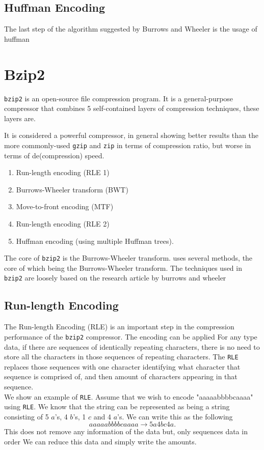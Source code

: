 \documentclass{article}
\begin{document}
\subsection{Huffman Encoding}
The last step of the algorithm suggested by Burrows and Wheeler is the usage of huffman

\section{Bzip2}
\texttt{bzip2} is an open-source file compression program. It is a general-purpose compressor that combines 5 self-contained layers of compression techniques, these layers are. 

It is considered a powerful compressor, in general showing better results than the more commonly-used \texttt{gzip} and \texttt{zip} in terms of compression ratio, but worse in terms of de(compression) speed.

\begin{enumerate}
	\item Run-length encoding (RLE 1)
	\item Burrows-Wheeler transform (BWT)
	\item Move-to-front encoding (MTF)
	\item Run-length encoding (RLE 2)
	\item Huffman encoding (using multiple Huffman trees).
\end{enumerate}

The core of \texttt{bzip2} is the Burrows-Wheeler transform. uses several methods, the core of which being the Burrows-Wheeler transform. The techniques used in \texttt{bzip2} are loosely based on the research article by burrows and wheeler %

\subsection{Run-length Encoding}
The Run-length Encoding (RLE) is an important step in the compression performance of the \texttt{bzip2} compressor.
The encoding can be applied
For any type data, if there are sequences of identically repeating characters, there is no need to store all the characters in those sequences of repeating characters. The \texttt{RLE} replaces those sequences with one character identifying what character that sequence is comprised of, and then amount of characters appearing in that sequence.\\
We show an example of \texttt{RLE}. Assume that we wish to encode "aaaaabbbbcaaaa" using \texttt{RLE}. We know that the string can be represented as being a string consisting of 5 \(a\)'s, 4 \(b\)'s, 1 \(c\) and 4 \(a\)'s. We can write this as the following
\[
aaaaabbbbcaaaa \rightarrow 5a4bc4a.
\]
This does not remove any information of the data but, only sequences data in order We can reduce this data and simply write the amounts. 
\end{document}

